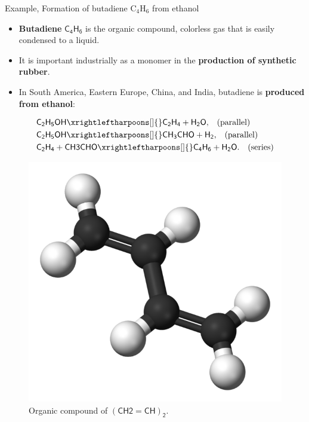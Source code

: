 \begin{frame}{Example, Formation of butadiene C$_4$H$_6$ from ethanol}
	\begin{itemize}
		\item \alert{\bf Butadiene} $\mathsf{C_4H_6}$ is the organic compound, colorless gas that is easily condensed to a liquid.
		\pause
		\item It is important industrially as a monomer in the \alert{\bf production of synthetic rubber}. 
		\pause
		\item In South America, Eastern Europe, China, and India, butadiene is {\bf produced from ethanol}:		
	\end{itemize}
	\lcol
	\pause
	\begin{alignat*}{2}
		& \mathsf{C_2H_5OH \xrightleftharpoons[]{} C_2H_4 + H_2O,} \quad \mbox{(parallel)}\\
		& \mathsf{C_2H_5OH \xrightleftharpoons[]{} CH_3CHO + H_2,}  \quad \mbox{(parallel)}\\
		& \mathsf{C_2H_4 + CH3CHO \xrightleftharpoons[]{}  C_4H_6 + H_2O.}  \quad \mbox{(series)}
	\end{alignat*}
	\rcol
	\begin{figure}[!t]
		\includegraphics[scale=0.15]{figures/chemical-kinetics/butadiene.png}
		\caption{Organic compound of $\mathsf{(CH2=CH)_2}$.}
	\end{figure}
	\ecol
\end{frame}
